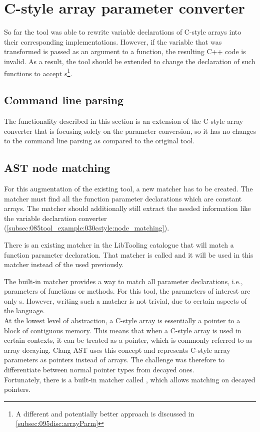 
\section{C-style array parameter converter} \label{sec:080:035:cstyleArrayParm}

So far the tool was able to rewrite variable declarations of C-style arrays into their corresponding  implementations. However, if the variable that was transformed is passed as an argument to a function, the resulting C++ code is invalid.
As a result, the tool should be extended to change the declaration of such functions to accept s\footnote{
    A different and potentially better approach is discussed in \cref{subsec:095disc:arrayParm}
}.

\subsection{Command line parsing}

The functionality described in this section is an extension of the C-style array converter that is focusing solely on the parameter conversion, so it has no changes to the command line parsing as compared to the original tool.

\subsection{AST node matching}

For this augmentation of the existing tool, a new matcher has to be created. The matcher must find all the function parameter declarations which are constant arrays. The matcher should additionally still extract the needed information like the variable declaration converter (\cref{subsec:085tool_example:030cstyle:node_matching}).

There is an existing matcher in the LibTooling catalogue that will match a function parameter declaration. That matcher is called  and it will be used in this matcher instead of the  used previously.

The built-in matcher  provides a way to match all parameter declarations, i.e., parameters of functions or methods. For this tool, the parameters of interest are only s. However, writing such a matcher is not trivial, due to certain aspects of the language.\\
At the lowest level of abstraction, a C-style array is essentially a pointer to a block of contiguous memory.
This means that when a C-style array is used in certain contexts, it can be treated as a pointer, which is commonly referred to as array decaying.
Clang AST uses this concept and represents C-style array parameters as pointers instead of arrays.
The challenge was therefore to differentiate between normal pointer types from decayed ones.\\
Fortunately, there is a built-in matcher called , which allows matching on decayed pointers.

